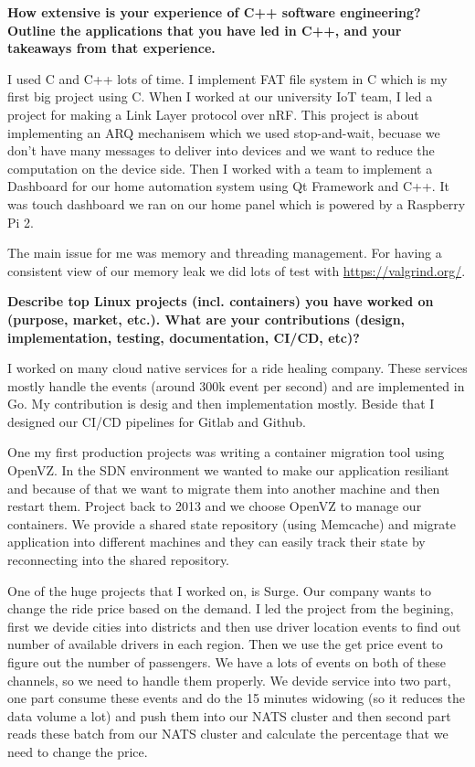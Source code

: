 \textbf{How extensive is your experience of C++ software engineering? Outline the applications that you have led in C++,
and your takeaways from that experience.}

I used C and C++ lots of time. I implement FAT file system in C which is my first big project using C. When I worked
at our university IoT team, I led a project for making a Link Layer protocol over nRF. This project is about implementing
an ARQ mechanisem which we used stop-and-wait, becuase we don't have many messages to deliver into devices and we want
to reduce the computation on the device side.
Then I worked with a team to implement a Dashboard for our home automation system using Qt Framework and C++. It was
touch dashboard we ran on our home panel which is powered by a Raspberry Pi 2.

The main issue for me was memory and threading management. For having a consistent view of our memory leak we did lots
of test with \href{Valgrind}{https://valgrind.org/}.

\textbf{Describe top Linux projects (incl. containers) you have worked on (purpose, market, etc.).
What are your contributions (design, implementation, testing, documentation, CI/CD, etc)?}

I worked on many cloud native services for a ride healing company. These services mostly handle the events (around
300k event per second) and are implemented in Go. My contribution is desig and then implementation mostly. Beside that
I designed our CI/CD pipelines for Gitlab and Github.

One my first production projects was writing a container migration tool using OpenVZ. In the SDN environment we wanted
to make our application resiliant and because of that we want to migrate them into another machine and then restart them.
Project back to 2013 and we choose OpenVZ to manage our containers. We provide a shared state repository (using Memcache)
and migrate application into different machines and they can easily track their state by reconnecting into the shared
repository.

One of the huge projects that I worked on, is Surge. Our company wants to change the ride price based on the demand.
I led the project from the begining, first we devide cities into districts and then use driver location events to find
out number of available drivers in each region. Then we use the get price event to figure out the number of passengers.
We have a lots of events on both of these channels, so we need to handle them properly. We devide service into two part,
one part consume these events and do the 15 minutes widowing (so it reduces the data volume a lot) and
push them into our NATS cluster and then second part reads these batch from our NATS cluster and calculate
the percentage that we need to change the price.

